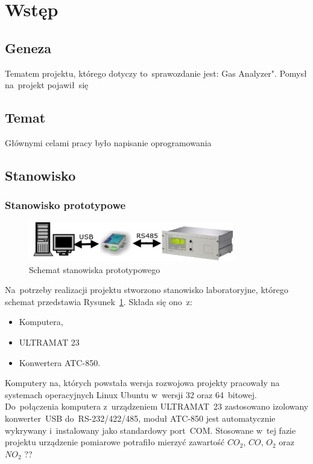 \section{Wstęp}

\subsection{Geneza}
Tematem projektu, którego dotyczy to~sprawozdanie jest: Gas Analyzer". Pomysł na~projekt pojawił~się 

\subsection{Temat}
Głównymi celami pracy było napisanie oprogramowania

\subsection{Stanowisko}
\subsubsection{Stanowisko prototypowe}
\begin{figure}[!htb] 	\centering 	\includegraphics[width=0.8\textwidth]{images/schemat1} 	\caption{Schemat stanowiska prototypowego} \label{schemat1} \end{figure} 
Na~potrzeby realizacji projektu stworzono stanowisko laboratoryjne, którego schemat przedstawia Rysunek~\ref{schemat1}. Składa się ono~z:
\begin{itemize}
\item Komputera,
\item ULTRAMAT 23
\item Konwertera ATC-850.
\end{itemize}
\indent
\indent Komputery na, których powstała wersja rozwojowa projekty pracowały na systemach operacyjnych Linux Ubuntu w~wersji 32 oraz 64~bitowej. Do~połączenia komputera z~urządzeniem ULTRAMAT~23 zastosowano izolowany konwerter~USB do~RS-232/422/485, moduł ATC-850 jest automatycznie wykrywany i~instalowany jako standardowy port~COM. Stosowane w~tej fazie projektu urządzenie pomiarowe potrafiło mierzyć zawartość $ CO_2 $, $ CO $, $ O_2 $ oraz $ NO_2 $ ??

